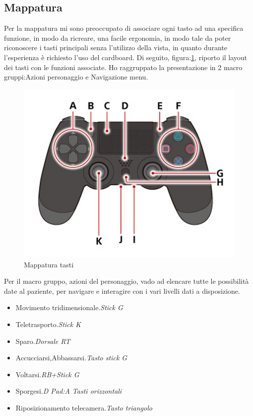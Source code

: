 \documentclass[
a4paper,
cleardoublepage=empty,
headings=twolinechapter,
numbers=autoenddot,
]{scrbook}
\begin{document}
     \subsection{Mappatura}
     Per la mappatura mi sono preoccupato di associare ogni tasto ad una specifica funzione, in modo da ricreare, una facile ergonomia, in modo tale da poter riconoscere i tasti principali senza l'utilizzo della vista, in quanto durante l'esperienza è richiesto l'uso del cardboard.
     Di seguito, figura:\ref{fig:gamepad_tasti}, riporto il layout dei tasti con le funzioni associate.
     Ho raggruppato la presentazione in 2 macro gruppi:Azioni personaggio e Navigazione menu.
     \begin{figure}[h]
     	\centering
     	\includegraphics[width=0.8\linewidth]{image/gamepad_tasti}
     	\caption{Mappatura tasti}
     	\label{fig:gamepad_tasti}
     \end{figure}
      Per il macro gruppo, azioni del personaggio, vado ad elencare tutte le possibilità date al paziente, per navigare e interagire con i vari livelli dati a disposizione.
     \begin{itemize}
     	\item Movimento tridimensionale.\textit{Stick G}
     	\item Teletrasporto.\textit{Stick K}
     	\item Sparo.\textit{Dorsale RT}
     	\item Accucciarsi,Abbassarsi.\textit{Tasto stick G}
     	\item Voltarsi.\textit{RB+Stick G}
     	\item Sporgesi.\textit{D Pad:A Tasti orizzontali}
     	\item Riposizionamento telecamera.\textit{Tasto triangolo}
     \end{itemize}
\end{document}

